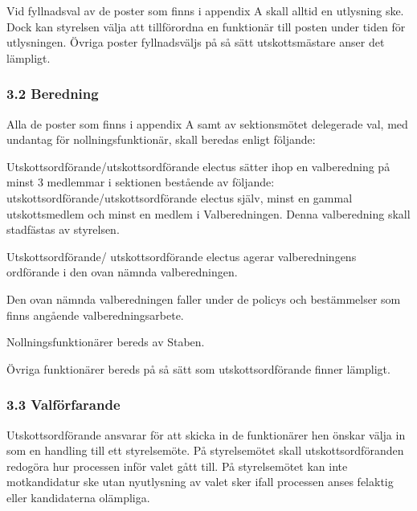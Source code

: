 \documentclass{dsekkallelse}
\begin{document}
Vid fyllnadsval av de poster som finns i appendix A skall alltid en utlysning ske. Dock kan styrelsen välja att tillförordna en funktionär till posten under tiden för utlysningen. Övriga poster fyllnadsväljs på så sätt utskottsmästare anser det lämpligt. 

\subsubsection{3.2 Beredning}

Alla de poster som finns i appendix A samt av sektionsmötet delegerade val, med undantag för nollningsfunktionär, skall beredas enligt följande:

Utskottsordförande/utskottsordförande electus sätter ihop en valberedning på minst 3 medlemmar i sektionen bestående av följande: utskottsordförande/utskottsordförande electus själv, minst en gammal utskottsmedlem och minst en medlem i Valberedningen. Denna valberedning skall stadfästas av styrelsen.

Utskottsordförande/ utskottsordförande electus agerar valberedningens ordförande i den ovan nämnda valberedningen. 

Den ovan nämnda valberedningen faller under de policys och bestämmelser som finns angående valberedningsarbete. 

Nollningsfunktionärer bereds av Staben. 

Övriga funktionärer bereds på så sätt som utskottsordförande finner lämpligt. 

\subsubsection{3.3 Valförfarande}
Utskottsordförande ansvarar för att skicka in de funktionärer hen önskar välja in som en handling till ett styrelsemöte. På styrelsemötet skall utskottsordföranden redogöra hur processen inför valet gått till. På styrelsemötet kan inte motkandidatur ske utan nyutlysning av valet sker ifall processen anses felaktig eller kandidaterna olämpliga. 

\pagebreak
\end{document}
